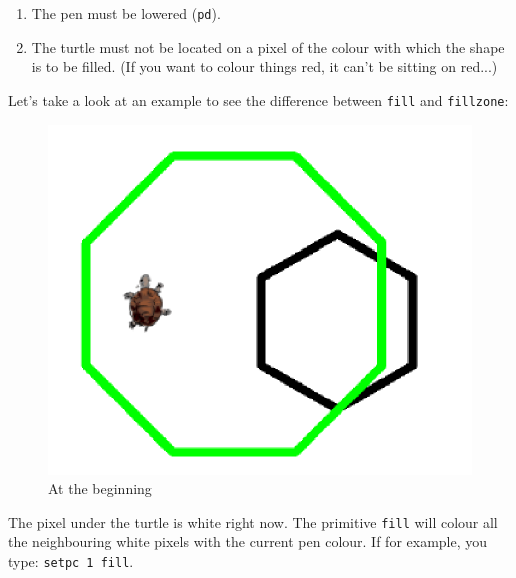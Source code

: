 \begin{enumerate}
\item The pen must be lowered (\texttt{pd}). 
\item The turtle must not be located on a pixel of the colour with which
the shape is to be filled. (If you want to colour things red, it can't
be sitting on red...) 
\end{enumerate}
\noindent Let's take a look at an example to see the difference between \texttt{fill} and \texttt{fillzone}:\\
\begin{figure}[h]
\begin{center}
\includegraphics*[scale=0.2]{pics/remplis.png}
\end{center}
\caption{At the beginning}
\end{figure}
\noindent
The pixel under the turtle is white right now. The primitive \texttt{fill} will colour all the neighbouring white pixels with the current pen colour. If for example, you type: \texttt{setpc 1 fill}.
